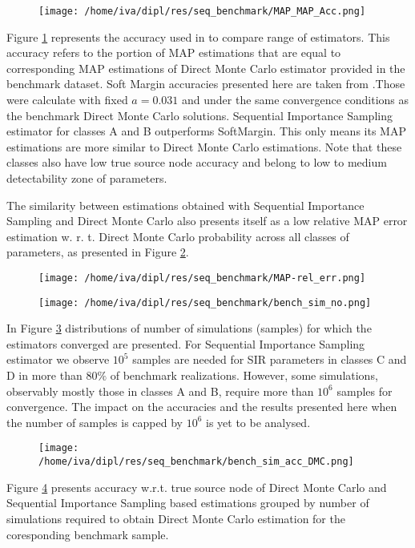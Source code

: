 \documentclass[times, utf8, diplomski]{fer}
\begin{document}
\begin{figure}[H]
\texttt{[image: /home/iva/dipl/res/seq\_benchmark/MAP\_MAP\_Acc.png]}
\caption{}
\label{map_map_acc}
\end{figure}
Figure \ref{map_map_acc} represents the accuracy used in \cite{Nino} to compare range of estimators. This accuracy refers to the portion of MAP estimations that are equal to corresponding MAP estimations of Direct Monte Carlo estimator provided in the benchmark dataset. Soft Margin accuracies presented here are taken from \cite{Nino}.Those were calculate with fixed $a=0.031$ and under the same convergence conditions as the benchmark Direct Monte Carlo solutions. Sequential Importance Sampling estimator for classes A and B outperforms SoftMargin. This only means its MAP estimations are  more similar to Direct Monte Carlo estimations. Note that these classes also have low true source node accuracy and belong to low  to medium detectability zone of parameters.

The similarity between estimations obtained with Sequential Importance Sampling and Direct Monte Carlo also presents itself as a low relative MAP error estimation w. r. t. Direct Monte Carlo probability across all classes of parameters, as presented in Figure \ref{rel_err}.
\begin{figure}[H]
\texttt{[image: /home/iva/dipl/res/seq\_benchmark/MAP-rel\_err.png]}
\caption{}
\label{rel_err}
\end{figure}

\begin{figure}[H]
\texttt{[image: /home/iva/dipl/res/seq\_benchmark/bench\_sim\_no.png]}
\caption{}
\label{bench_sim_no}
\end{figure}
In Figure \ref{bench_sim_no} distributions of number of simulations (samples) for which the estimators converged are presented. For Sequential Importance Sampling estimator we observe $10^5$ samples are needed for SIR parameters in classes C and D in more than $80\%$ of benchmark realizations. However, some simulations, observably mostly those in classes A and B, require more than $10^6$ samples for convergence. The impact on the accuracies and the results presented here when the number of samples is capped by $10^6$ is yet to be analysed. 

\begin{figure}[H]
\texttt{[image: /home/iva/dipl/res/seq\_benchmark/bench\_sim\_acc\_DMC.png]}
\caption{}
\label{bench_sim_accDMC}
\end{figure}
Figure \ref{bench_sim_accDMC} presents accuracy w.r.t. true source node of Direct Monte Carlo and Sequential Importance Sampling based estimations grouped by number of simulations required to obtain Direct Monte Carlo estimation for the coresponding benchmark sample. 
	
\end{document}
